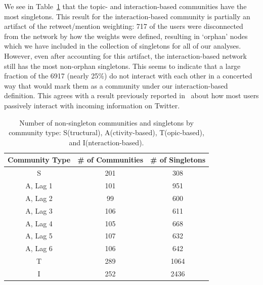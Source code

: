 \documentclass[10pt,letterpaper]{article}
\begin{document}
We see in Table~\ref{Table-comm_count} that the topic- and interaction-based communities have the most singletons. This result for the interaction-based community is partially an artifact of the retweet/mention weighting: 717 of the users were disconnected from the network by how the weights were defined, resulting in `orphan' nodes which we have included in the collection of singletons for all of our analyses. However, even after accounting for this artifact, the interaction-based network still has the most non-orphan singletons. This seems to indicate that a large fraction of the 6917 (nearly 25\%) do not interact with each other in a concerted way that would mark them as a community under our interaction-based definition. This agrees with a result previously reported in~\cite{romero2011influence} about how most users passively interact with incoming information on Twitter.

\begin{table}[ht]
	\caption{Number of non-singleton communities and singletons by community type: S(tructural), A(ctivity-based), T(opic-based), and I(nteraction-based).}
	\centering
	\begin{tabular}{| c | c | c |}
		\hline Community Type & \# of Communities & \# of Singletons \\ \hline
		S & 201 & 308 \\
		A, Lag 1 & 101 & 951 \\
		A, Lag 2 & 99 & 600 \\
		A, Lag 3 & 106 & 611 \\
		A, Lag 4 & 105 & 668 \\
		A, Lag 5 & 107 & 632 \\
		A, Lag 6 & 106 & 642 \\
		T & 289 & 1064 \\
		I & 252 & 2436  \\ \hline
	\end{tabular}
	\label{Table-comm_count}
\end{table}
\end{document}

